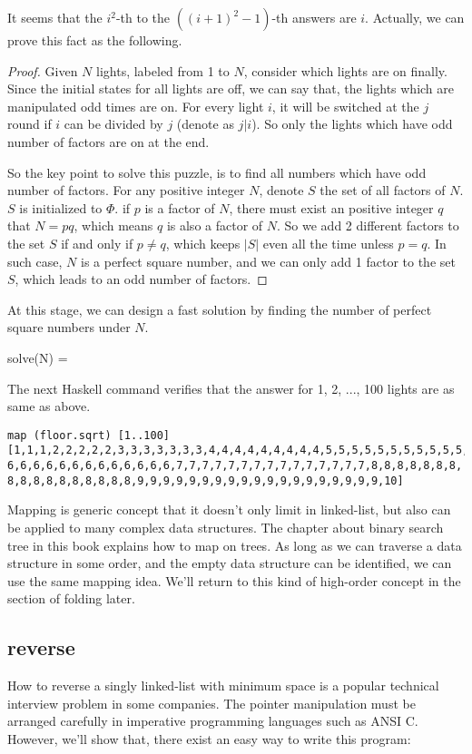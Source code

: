 \documentclass{article}
\begin{document}
It seems that the $i^2$-th to the $((i+1)^2-1)$-th answers are $i$. Actually, we can prove this fact as the following.

\begin{proof}
Given $N$ lights, labeled from 1 to $N$, consider which lights are on finally. Since the initial states for all lights
are off, we can say that, the lights which are manipulated odd times are on. For every light $i$, it will be switched
at the $j$ round if $i$ can be divided by $j$ (denote as $j | i$). So only the lights which have odd number of factors are on at the end.

So the key point to solve this puzzle, is to find all numbers which have odd number of factors. For any positive integer
$N$, denote $S$ the set of all factors of $N$. $S$ is initialized to $\Phi$. if $p$ is a factor of $N$, there must
exist an positive integer $q$ that $N = p q$, which means $q$ is also a factor of $N$. So we add 2 different factors to 
the set $S$ if and only if $p \neq q$, which keeps $|S|$ even all the time unless $p = q$. In such case, $N$ is a
perfect square number, and we can only add 1 factor to the set $S$, which leads to an odd number of factors.
\end{proof}


At this stage, we can design a fast solution by finding the number of perfect square numbers under $N$.

\be
solve(N) = \lfloor {} \rfloor
\ee

The next Haskell command verifies that the answer for 1, 2, ..., 100 lights are as same as above.

\begin{lstlisting}
map (floor.sqrt) [1..100]
[1,1,1,2,2,2,2,2,3,3,3,3,3,3,3,4,4,4,4,4,4,4,4,4,5,5,5,5,5,5,5,5,5,5,5,
6,6,6,6,6,6,6,6,6,6,6,6,6,7,7,7,7,7,7,7,7,7,7,7,7,7,7,7,8,8,8,8,8,8,8,
8,8,8,8,8,8,8,8,8,8,9,9,9,9,9,9,9,9,9,9,9,9,9,9,9,9,9,9,9,10]
\end{lstlisting}

Mapping is generic concept that it doesn't only limit in linked-list, but also can be applied to many
complex data structures. The chapter about binary search tree in this book explains how to map on trees.
As long as we can traverse a data structure in some order, and the empty data structure can be identified,
we can use the same mapping idea. We'll return to this kind of high-order concept in the section of folding 
later.

\subsection{reverse}
How to reverse a singly linked-list with minimum space is a popular technical interview problem in some companies.
The pointer manipulation must be arranged carefully in imperative programming languages such as ANSI C. 
However, we'll show that, there exist an easy way to write this program:
\end{document}
